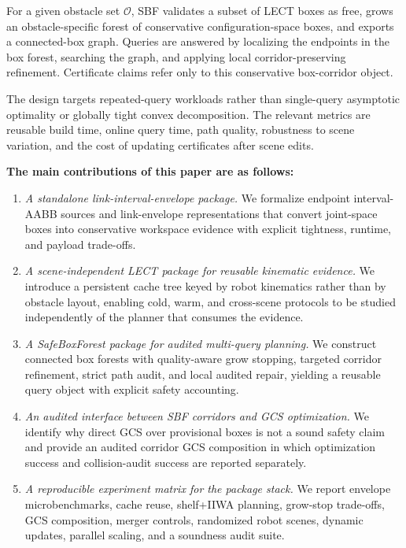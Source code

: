\documentclass[journal]{IEEEtran}
\begin{document}
For a given obstacle set $\mathcal{O}$, SBF validates a subset of LECT boxes as
free, grows an obstacle-specific forest of conservative configuration-space
boxes, and exports a connected-box graph. Queries are answered by localizing
the endpoints in the box forest, searching the graph, and applying local
corridor-preserving refinement. Certificate claims refer only to this
conservative box-corridor object.

The design targets repeated-query workloads rather than single-query
asymptotic optimality or globally tight convex decomposition. The relevant
metrics are reusable build time, online query time, path quality, robustness to
scene variation, and the cost of updating certificates after scene edits.

\textbf{The main contributions of this paper are as follows:}
\begin{enumerate}[nosep]
  \item \emph{A standalone link-interval-envelope package.}
  We formalize endpoint interval-AABB sources and link-envelope representations
  that convert joint-space boxes into conservative workspace evidence with
  explicit tightness, runtime, and payload trade-offs.

  \item \emph{A scene-independent LECT package for reusable kinematic evidence.}
  We introduce a persistent cache tree keyed by robot kinematics rather than by
  obstacle layout, enabling cold, warm, and cross-scene protocols to be studied
  independently of the planner that consumes the evidence.

  \item \emph{A SafeBoxForest package for audited multi-query planning.}
  We construct connected box forests with quality-aware grow stopping, targeted
  corridor refinement, strict path audit, and local audited repair, yielding a
  reusable query object with explicit safety accounting.

  \item \emph{An audited interface between SBF corridors and GCS optimization.}
  We identify why direct GCS over provisional boxes is not a sound safety claim
  and provide an audited corridor GCS composition in which optimization success
  and collision-audit success are reported separately.

  \item \emph{A reproducible experiment matrix for the package stack.}
  We report envelope microbenchmarks, cache reuse, shelf+IIWA planning,
  grow-stop trade-offs, GCS composition, merger controls, randomized robot
  scenes, dynamic updates, parallel scaling, and a soundness audit suite.
\end{enumerate}
\end{document}
